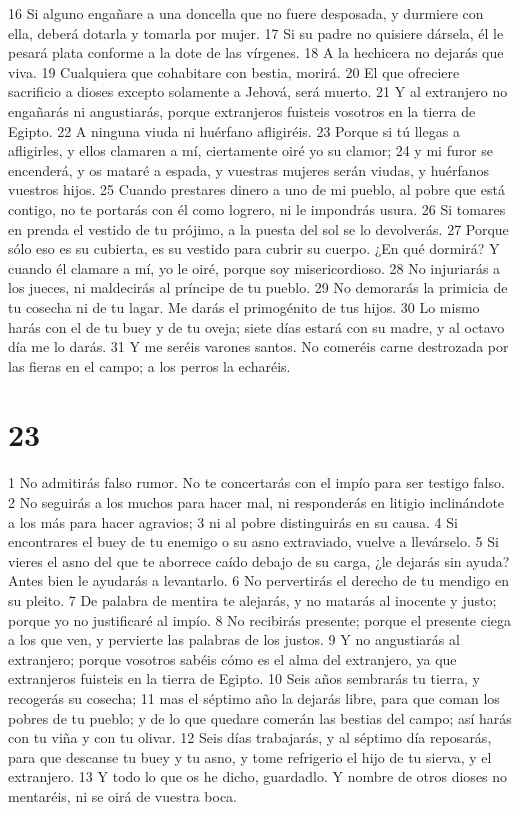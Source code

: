 16 Si alguno engañare a una doncella que no fuere desposada, y durmiere con ella, deberá dotarla y tomarla por mujer.
17 Si su padre no quisiere dársela, él le pesará plata conforme a la dote de las vírgenes.
18 A la hechicera no dejarás que viva.
19 Cualquiera que cohabitare con bestia, morirá.
20 El que ofreciere sacrificio a dioses excepto solamente a Jehová, será muerto.
21 Y al extranjero no engañarás ni angustiarás, porque extranjeros fuisteis vosotros en la tierra de Egipto.
22 A ninguna viuda ni huérfano afligiréis.
23 Porque si tú llegas a afligirles, y ellos clamaren a mí, ciertamente oiré yo su clamor;
24 y mi furor se encenderá, y os mataré a espada, y vuestras mujeres serán viudas, y huérfanos vuestros hijos.
25 Cuando prestares dinero a uno de mi pueblo, al pobre que está contigo, no te portarás con él como logrero, ni le impondrás usura.
26 Si tomares en prenda el vestido de tu prójimo, a la puesta del sol se lo devolverás.
27 Porque sólo eso es su cubierta, es su vestido para cubrir su cuerpo. ¿En qué dormirá? Y cuando él clamare a mí, yo le oiré, porque soy misericordioso.
28 No injuriarás a los jueces, ni maldecirás al príncipe de tu pueblo.
29 No demorarás la primicia de tu cosecha ni de tu lagar. Me darás el primogénito de tus hijos.
30 Lo mismo harás con el de tu buey y de tu oveja; siete días estará con su madre, y al octavo día me lo darás.
31 Y me seréis varones santos. No comeréis carne destrozada por las fieras en el campo; a los perros la echaréis.

\chapter{23}

1 No admitirás falso rumor. No te concertarás con el impío para ser testigo falso.
2 No seguirás a los muchos para hacer mal, ni responderás en litigio inclinándote a los más para hacer agravios;
3 ni al pobre distinguirás en su causa.
4 Si encontrares el buey de tu enemigo o su asno extraviado, vuelve a llevárselo.
5 Si vieres el asno del que te aborrece caído debajo de su carga, ¿le dejarás sin ayuda? Antes bien le ayudarás a levantarlo.
6 No pervertirás el derecho de tu mendigo en su pleito.
7 De palabra de mentira te alejarás, y no matarás al inocente y justo; porque yo no justificaré al impío.
8 No recibirás presente; porque el presente ciega a los que ven, y pervierte las palabras de los justos.
9 Y no angustiarás al extranjero; porque vosotros sabéis cómo es el alma del extranjero, ya que extranjeros fuisteis en la tierra de Egipto.
10 Seis años sembrarás tu tierra, y recogerás su cosecha;
11 mas el séptimo año la dejarás libre, para que coman los pobres de tu pueblo; y de lo que quedare comerán las bestias del campo; así harás con tu viña y con tu olivar.
12 Seis días trabajarás, y al séptimo día reposarás,  para que descanse tu buey y tu asno, y tome refrigerio el hijo de tu sierva, y el extranjero.
13 Y todo lo que os he dicho, guardadlo. Y nombre de otros dioses no mentaréis, ni se oirá de vuestra boca.

